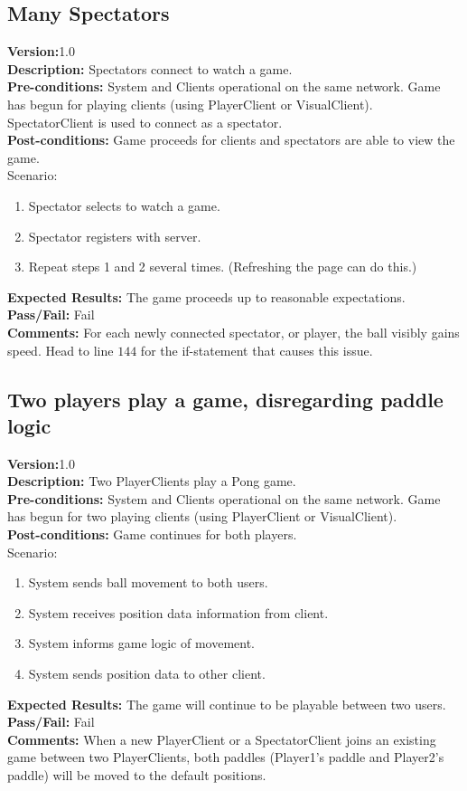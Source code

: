 \documentclass[12pt]{article}
\begin{document}
\subsection{Many Spectators}
\label{sec:manySpectators}
\textbf{Version:}1.0\\
\textbf{Description:} Spectators connect to watch a game.\\
\textbf{Pre-conditions:} System and Clients operational on the same network.  Game has begun for playing clients (using PlayerClient or VisualClient).  SpectatorClient is used to connect as a spectator.\\
\textbf{Post-conditions:} Game proceeds for clients and spectators are able to view the game.\\
Scenario:
\begin{enumerate}
\item Spectator selects to watch a game.
\item Spectator registers with server.
\item Repeat steps 1 and 2 several times. (Refreshing the page can do this.)
\end{enumerate}
\textbf{Expected Results:} The game proceeds up to reasonable expectations.\\
\textbf{Pass/Fail:} Fail\\
\textbf{Comments:} For each newly connected spectator, or player, the ball visibly gains speed.  Head to line $144$ for the if-statement that causes this issue.


\subsection{Two players play a game, disregarding paddle logic}
\label{sec:gameNoLogic}
\textbf{Version:}1.0\\
\textbf{Description:} Two PlayerClients play a Pong game.\\
\textbf{Pre-conditions:} System and Clients operational on the same network.  Game has begun for two playing clients (using PlayerClient or VisualClient).\\
\textbf{Post-conditions:} Game continues for both players.\\
Scenario:
\begin{enumerate}
\item System sends ball movement to both users.
\item System receives position data information from client.
\item System informs game logic of movement.
\item System sends position data to other client.
\end{enumerate}
\textbf{Expected Results:} The game will continue to be playable between two users.
\textbf{Pass/Fail:} Fail\\
\textbf{Comments:} When a new PlayerClient or a SpectatorClient joins an existing game between two PlayerClients, both paddles (Player1’s paddle and Player2’s paddle) will be moved to the default positions.
\end{document}
